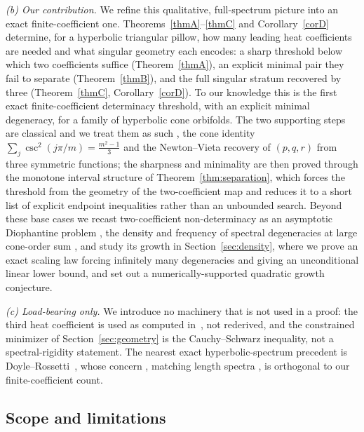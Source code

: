 \documentclass[12pt, letterpaper]{article}
\theoremstyle{definition}
\theoremstyle{plain}
\begin{document}
\emph{(b) Our contribution.} We refine this qualitative, full-spectrum picture into an exact finite-coefficient one. Theorems~\ref{thmA}--\ref{thmC} and Corollary~\ref{corD} determine, for a hyperbolic triangular pillow, how many leading heat coefficients are needed and what singular geometry each encodes: a sharp threshold below which two coefficients suffice (Theorem~\ref{thmA}), an explicit minimal pair they fail to separate (Theorem~\ref{thmB}), and the full singular stratum recovered by three (Theorem~\ref{thmC}, Corollary~\ref{corD}). To our knowledge this is the first exact finite-coefficient determinacy threshold, with an explicit minimal degeneracy, for a family of hyperbolic cone orbifolds. The two supporting steps are classical and we treat them as such ,  the cone identity $\sum_j\csc^2(j\pi/m)=\tfrac{m^2-1}{3}$ and the Newton--Vieta recovery of $(p,q,r)$ from three symmetric functions; the sharpness and minimality are then proved through the monotone interval structure of Theorem~\ref{thm:separation}, which forces the threshold from the geometry of the two-coefficient map and reduces it to a short list of explicit endpoint inequalities rather than an unbounded search. Beyond these base cases we recast two-coefficient non-determinacy as an asymptotic Diophantine problem ,  the density and frequency of spectral degeneracies at large cone-order sum ,  and study its growth in Section~\ref{sec:density}, where we prove an exact scaling law forcing infinitely many degeneracies and giving an unconditional linear lower bound, and set out a numerically-supported quadratic growth conjecture.

\emph{(c) Load-bearing only.} We introduce no machinery that is not used in a proof: the third heat coefficient is used as computed in~\cite{dggw2008, schueth2019, ucar2017}, not rederived, and the constrained minimizer of Section~\ref{sec:geometry} is the Cauchy--Schwarz inequality, not a spectral-rigidity statement. The nearest exact hyperbolic-spectrum precedent is Doyle--Rossetti~\cite{doylerossetti2008}, whose concern ,  matching length spectra ,  is orthogonal to our finite-coefficient count.

\subsection{Scope and limitations}
\label{sec:scope}
\end{document}
